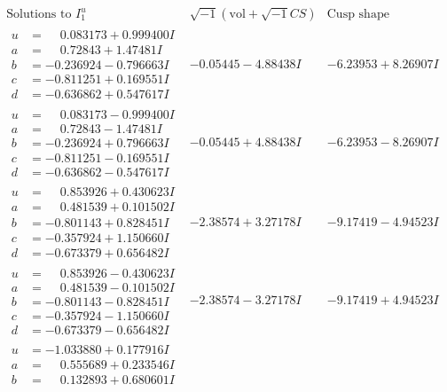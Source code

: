 \documentclass[1p]{elsarticle_modified}
\theoremstyle{definition}
\newcommand{\I}{\sqrt{-1}}
\begin{document}
$$\begin{array}{c|c|c}  
\text{Solutions to }I^u_{1}& \I (\text{vol} + \sqrt{-1}CS) & \text{Cusp shape}\\
 \hline 
\begin{aligned}
u &= \phantom{-}0.083173 + 0.999400 I \\
a &= \phantom{-}0.72843 + 1.47481 I \\
b &= -0.236924 - 0.796663 I \\
c &= -0.811251 + 0.169551 I \\
d &= -0.636862 + 0.547617 I\end{aligned}
 & -0.05445 - 4.88438 I & -6.23953 + 8.26907 I \\ \hline\begin{aligned}
u &= \phantom{-}0.083173 - 0.999400 I \\
a &= \phantom{-}0.72843 - 1.47481 I \\
b &= -0.236924 + 0.796663 I \\
c &= -0.811251 - 0.169551 I \\
d &= -0.636862 - 0.547617 I\end{aligned}
 & -0.05445 + 4.88438 I & -6.23953 - 8.26907 I \\ \hline\begin{aligned}
u &= \phantom{-}0.853926 + 0.430623 I \\
a &= \phantom{-}0.481539 + 0.101502 I \\
b &= -0.801143 + 0.828451 I \\
c &= -0.357924 + 1.150660 I \\
d &= -0.673379 + 0.656482 I\end{aligned}
 & -2.38574 + 3.27178 I & -9.17419 - 4.94523 I \\ \hline\begin{aligned}
u &= \phantom{-}0.853926 - 0.430623 I \\
a &= \phantom{-}0.481539 - 0.101502 I \\
b &= -0.801143 - 0.828451 I \\
c &= -0.357924 - 1.150660 I \\
d &= -0.673379 - 0.656482 I\end{aligned}
 & -2.38574 - 3.27178 I & -9.17419 + 4.94523 I \\ \hline\begin{aligned}
u &= -1.033880 + 0.177916 I \\
a &= \phantom{-}0.555689 + 0.233546 I \\
b &= \phantom{-}0.132893 + 0.680601 I \\

\end{aligned}
\end{array}$$
\end{document}
